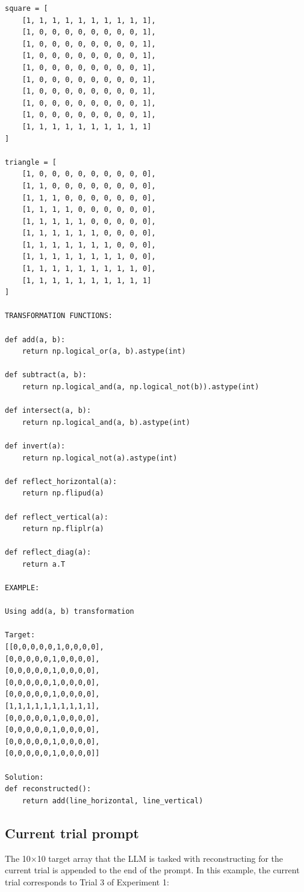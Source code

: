 \documentclass{article}
\begin{document}
\begin{verbatim}
square = [
    [1, 1, 1, 1, 1, 1, 1, 1, 1, 1],
    [1, 0, 0, 0, 0, 0, 0, 0, 0, 1],
    [1, 0, 0, 0, 0, 0, 0, 0, 0, 1],
    [1, 0, 0, 0, 0, 0, 0, 0, 0, 1],
    [1, 0, 0, 0, 0, 0, 0, 0, 0, 1],
    [1, 0, 0, 0, 0, 0, 0, 0, 0, 1],
    [1, 0, 0, 0, 0, 0, 0, 0, 0, 1],
    [1, 0, 0, 0, 0, 0, 0, 0, 0, 1],
    [1, 0, 0, 0, 0, 0, 0, 0, 0, 1],
    [1, 1, 1, 1, 1, 1, 1, 1, 1, 1]
]

triangle = [
    [1, 0, 0, 0, 0, 0, 0, 0, 0, 0],
    [1, 1, 0, 0, 0, 0, 0, 0, 0, 0],
    [1, 1, 1, 0, 0, 0, 0, 0, 0, 0],
    [1, 1, 1, 1, 0, 0, 0, 0, 0, 0],
    [1, 1, 1, 1, 1, 0, 0, 0, 0, 0],
    [1, 1, 1, 1, 1, 1, 0, 0, 0, 0],
    [1, 1, 1, 1, 1, 1, 1, 0, 0, 0],
    [1, 1, 1, 1, 1, 1, 1, 1, 0, 0],
    [1, 1, 1, 1, 1, 1, 1, 1, 1, 0],
    [1, 1, 1, 1, 1, 1, 1, 1, 1, 1]
]

TRANSFORMATION FUNCTIONS:

def add(a, b):
    return np.logical_or(a, b).astype(int)

def subtract(a, b):
    return np.logical_and(a, np.logical_not(b)).astype(int)

def intersect(a, b):
    return np.logical_and(a, b).astype(int)

def invert(a):
    return np.logical_not(a).astype(int)

def reflect_horizontal(a):
    return np.flipud(a)

def reflect_vertical(a):
    return np.fliplr(a)

def reflect_diag(a):
    return a.T

EXAMPLE:

Using add(a, b) transformation

Target:
[[0,0,0,0,0,1,0,0,0,0], 
[0,0,0,0,0,1,0,0,0,0], 
[0,0,0,0,0,1,0,0,0,0],
[0,0,0,0,0,1,0,0,0,0], 
[0,0,0,0,0,1,0,0,0,0], 
[1,1,1,1,1,1,1,1,1,1],
[0,0,0,0,0,1,0,0,0,0], 
[0,0,0,0,0,1,0,0,0,0], 
[0,0,0,0,0,1,0,0,0,0],
[0,0,0,0,0,1,0,0,0,0]]

Solution:
def reconstructed():
    return add(line_horizontal, line_vertical)
\end{verbatim}

\subsection{Current trial prompt}

The 10×10 target array that the LLM is tasked with reconstructing for the current trial is appended to the end of the prompt. In this example, the current trial corresponds to Trial 3 of Experiment 1:
\end{document}
